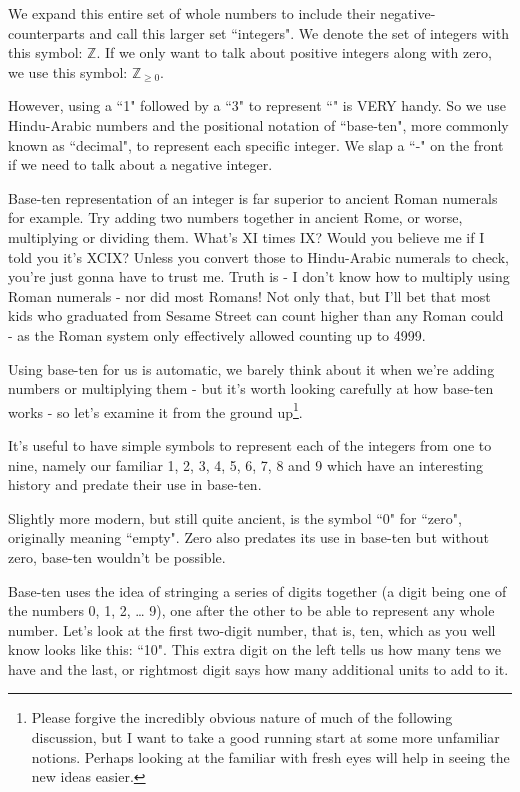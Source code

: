\documentclass{article}
\begin{document}
We expand this entire set of whole numbers to include their
negative-counterparts and call this larger set ``integers".
We denote the set of integers with this symbol: $\mathbb{Z}$.
If we only want to talk about positive integers along with zero,
we use this symbol: $\mathbb{Z}_{\ge 0}$.

However, using a ``1" followed by a ``3" to represent
``\faApple{}\faApple{}\faApple{}\faApple{}\faApple{}\faApple{}\faApple{}\faApple{}\faApple{}\faApple{}\faApple{}\faApple{}\faApple{}"
is VERY handy. So we use Hindu-Arabic numbers and the positional notation of ``base-ten",
more commonly known as ``decimal", to represent each specific integer.
We slap a ``-" on the front if we need to talk about a negative integer.

Base-ten representation of an integer is far superior to ancient Roman numerals for example.
Try adding two numbers together in ancient Rome, or worse,
multiplying or dividing them.
What's XI times IX? Would you believe me if I told
you it's XCIX? Unless you convert those to Hindu-Arabic numerals to check,
you're just gonna have to trust me.
Truth is - I don't know how to multiply using Roman
numerals - nor did most Romans! Not only that,
but I'll bet that most kids who graduated from Sesame Street
can count higher than any Roman could - as the
Roman system only effectively allowed counting up to 4999.

Using base-ten for us is automatic,
we barely think about it when we're adding numbers or multiplying
them - but it's worth looking carefully at how base-ten
works - so let's examine it from the ground up\footnote{Please forgive the incredibly obvious nature of much
of the following discussion, but I want to take a good running start
at some more unfamiliar notions. Perhaps looking at the familiar with fresh eyes will help in seeing the new ideas easier.}.

It's useful to have simple symbols to represent each of the integers from one to nine,
namely our familiar 1, 2, 3, 4, 5, 6, 7, 8 and 9
which have an interesting history and predate their use in base-ten.

Slightly more modern, but still quite ancient,
is the symbol ``0" for ``zero", originally meaning ``empty".
Zero also predates its use in base-ten but without zero,
base-ten wouldn't be possible.

Base-ten uses the idea of stringing a series of digits together
(a digit being one of the numbers 0, 1, 2, \dots{} 9),
one after the other to be able to represent any whole number.
Let's look at the first two-digit number, that is, ten,
which as you well know looks like this: ``10".
This extra digit on the left tells us how many tens we have and the last,
or rightmost digit says how many additional units to add to it.
\end{document}
